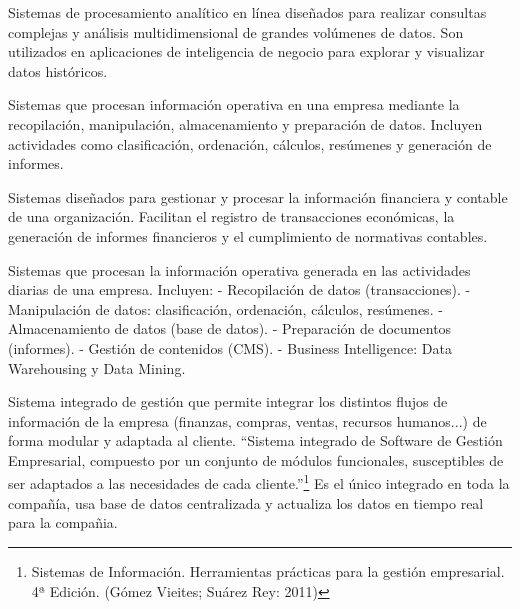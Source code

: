 \documentclass[12pt]{book} %
\begin{document}
\begin{definicion}
Sistemas de procesamiento analítico en línea diseñados para realizar consultas complejas y análisis multidimensional de grandes volúmenes de datos. Son utilizados en aplicaciones de inteligencia de negocio para explorar y visualizar datos históricos.
\end{definicion}

\begin{definicion}
Sistemas que procesan información operativa en una empresa mediante la recopilación, manipulación, almacenamiento y preparación de datos. Incluyen actividades como clasificación, ordenación, cálculos, resúmenes y generación de informes.
\end{definicion}

\begin{definicion}
Sistemas diseñados para gestionar y procesar la información financiera y contable de una organización. Facilitan el registro de transacciones económicas, la generación de informes financieros y el cumplimiento de normativas contables.
\end{definicion}

\begin{definicion}
Sistemas que procesan la información operativa generada en las actividades diarias de una empresa. Incluyen:
- Recopilación de datos (transacciones).
- Manipulación de datos: clasificación, ordenación, cálculos, resúmenes.
- Almacenamiento de datos (base de datos).
- Preparación de documentos (informes).
- Gestión de contenidos (CMS).
- Business Intelligence: Data Warehousing y Data Mining.
\end{definicion}

\begin{definicion}
Sistema integrado de gestión que permite integrar los distintos flujos de información de la empresa (finanzas, compras, ventas, recursos humanos...) de forma modular y adaptada al cliente. “Sistema integrado de Software de Gestión Empresarial, compuesto por un conjunto de módulos funcionales, susceptibles de ser adaptados a las necesidades de cada cliente.”\footnote{Sistemas de Información. Herramientas prácticas para la gestión empresarial. 4ª Edición. (Gómez Vieites; Suárez Rey: 2011)} Es el único integrado en toda la compañía, usa base de datos centralizada y actualiza los datos en tiempo real para la compañia.
\end{definicion}
\end{document}

